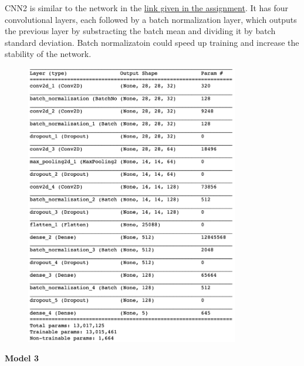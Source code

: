 \documentclass[12pt]{article}
\begin{document}
CNN2 is similar to the network in the \href{https://www.kaggle.com/fuzzywizard/fashion-mnist-cnn-keras-accuracy-93/}{link given in the assignment}. It has four convolutional layers, each followed by a batch normalization layer, which outputs the previous layer by substracting the batch mean and dividing it by batch standard deviation. Batch normalizatoin could speed up training and increase the stability of the network.
\begin{figure}[H]
\begin{center}
    \includegraphics[width=0.83\textwidth]{./plots/2.png}
\end{center}
\end{figure}
\vspace*{-1.0cm}

\textbf{Model 3}
\end{document}
